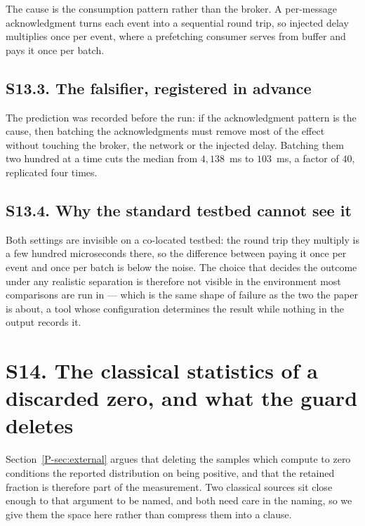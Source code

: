 \documentclass[10pt,journal,onecolumn]{IEEEtran}
\newcommand{\mainModeB}{\ref{P-sec:external}}              %
\begin{document}
The cause is the consumption pattern rather than the broker. A per-message acknowledgment
turns each event into a sequential round trip, so injected delay multiplies once per event,
where a prefetching consumer serves from buffer and pays it once per batch.

\subsection{S13.3. The falsifier, registered in advance}

The prediction was recorded before the run: if the acknowledgment pattern is the cause, then
batching the acknowledgments must remove most of the effect without touching the broker, the
network or the injected delay. Batching them two hundred at a time cuts the median from
$4{,}138$~ms to $103$~ms, a factor of $40$, replicated four times.

\subsection{S13.4. Why the standard testbed cannot see it}

Both settings are invisible on a co-located testbed: the round trip they multiply is a few
hundred microseconds there, so the difference between paying it once per event and once per
batch is below the noise. The choice that decides the outcome under any realistic separation
is therefore not visible in the environment most comparisons are run in --- which is the same
shape of failure as the two the paper is about, a tool whose configuration determines
the result while nothing in the output records it.
\section{S14. The classical statistics of a discarded zero, and what the guard deletes}
\label{sec:zeros}

Section~\mainModeB{} argues that deleting the samples which compute to zero conditions the reported
distribution on being positive, and that the retained fraction is therefore part of the
measurement. Two classical sources sit close enough to that argument to be named, and both
need care in the naming, so we give them the space here rather than compress them into a
clause.
\end{document}
